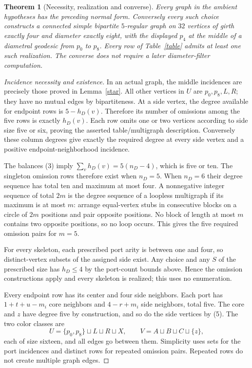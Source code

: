 \documentclass[11pt]{article}
\newtheorem{theorem}{Theorem}
\begin{document}
\begin{theorem}[Necessity, realization and converse]\label{converse}
Every graph in the ambient hypotheses has the preceding normal form.
Conversely every such choice constructs a connected simple bipartite
$5$-regular graph on $32$ vertices of girth exactly four and diameter
exactly eight, with the displayed $p_4$ at the middle of a diametral
geodesic from $p_0$ to $p_8$. Every row of Table~\ref{table} admits
at least one such realization. The converse does not require a later
diameter-filter computation.
\end{theorem}
\begin{proof}[Incidence necessity and existence]
In an actual graph, the middle incidences are precisely those proved
in Lemma~\ref{star}. All other vertices in $U$ are $p_0,p_8,L,R$;
they have no mutual edges by bipartiteness. At a side vertex,
the degree available for endpoint rows is $5-h_D(v)$. Therefore
its number of omissions among the five rows is exactly $h_D(v)$.
Each row omits one or two vertices according to side size five or
six, proving the asserted table/multigraph description. Conversely
these column degrees give exactly the required degree at every side
vertex and a positive endpoint-neighborhood incidence.

The balances (3) imply $\sum_v h_D(v)=5(n_D-4)$, which is five
or ten. The singleton omission rows therefore exist when $n_D=5$.
When $n_D=6$ their degree sequence has total ten and maximum at
most four. A nonnegative integer sequence of total $2m$ is the
degree sequence of a loopless multigraph if its maximum is at most
$m$: arrange equal-vertex stubs in consecutive blocks on a circle
of $2m$ positions and pair opposite positions. No block of length
at most $m$ contains two opposite positions, so no loop occurs.
This gives the five required omission pairs for $m=5$.

For every skeleton, each prescribed port arity is between one and
four, so distinct-vertex subsets of the assigned side exist. Any
choice and any $S$ of the prescribed size has $h_D\leq4$ by the
port-count bounds above. Hence the omission constructions apply
and every skeleton is realized; this uses no enumeration.

Every endpoint row has its center and four side neighbors. Each
port has $1+t+u-m_i$ core neighbors and $4-r+m_i$ side neighbors,
total five. The core and $z$ have degree five by construction,
and so do the side vertices by (5). The two color classes are
\[
 U=\{p_0,p_8\}\sqcup L\sqcup R\sqcup X,
 \qquad V=A\sqcup B\sqcup C\sqcup\{z\},
\]
each of size sixteen, and all edges go between them. Simplicity
uses sets for the port incidences and distinct rows for repeated
omission pairs. Repeated rows do not create multiple graph edges.


\end{proof}
\end{document}
